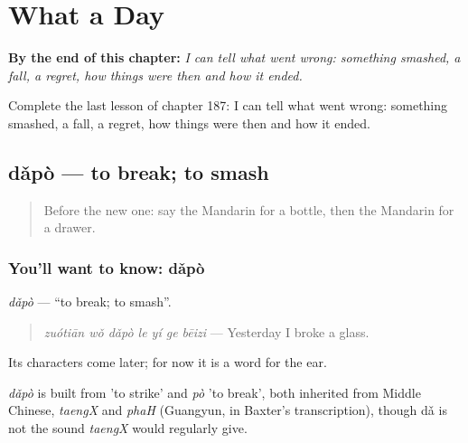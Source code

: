 
\chapter{What a Day}
\label{ch:zh-what-a-day}

\begin{chapteropening}
\textbf{By the end of this chapter:} \emph{I can tell what went wrong: something smashed, a fall, a regret, how things were then and how it ended.}

Complete the last lesson of chapter 187: I can tell what went wrong: something smashed, a fall, a regret, how things were then and how it ended.
\end{chapteropening}

\section[dǎpò]{dǎpò — to break; to smash}

\label{lesson:ZH-C187-dapo}



\begin{quote}
Before the new one: say the Mandarin for a bottle, then the Mandarin for a drawer.
\end{quote}

\subsection*{You'll want to know: dǎpò}
\emph{dǎpò} — \textquotedblleft{}to break; to smash\textquotedblright{}.

\begin{quote}
\emph{zuótiān wǒ dǎpò le yí ge bēizi} — Yesterday I broke a glass.
\end{quote}

Its characters come later; for now it is a word for the ear.

\begin{cousinweb}
\emph{dǎpò} is built from  'to strike' and \emph{pò} 'to break', both inherited from Middle Chinese, \emph{taengX} and \emph{phaH} (Guangyun, in Baxter's transcription), though dǎ is not the sound \emph{taengX} would regularly give.
\end{cousinweb}

